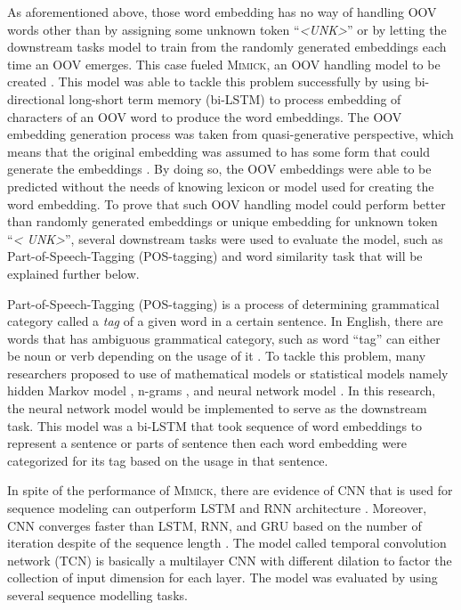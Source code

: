 As aforementioned above, those word embedding has no way of handling
OOV words other than by assigning some unknown token
``\textit{\textless UNK\textgreater}'' or by letting the downstream
tasks model to train from the randomly generated embeddings each time
an OOV emerges. This case fueled \textsc{Mimick}, an OOV handling
model to be created \citep{mimicking2017Pinter}. This model was able
to tackle this problem successfully by using bi-directional long-short
term memory (bi-LSTM) to process embedding of characters of an OOV
word to produce the word embeddings. The OOV embedding generation
process was taken from quasi-generative perspective, which means that
the original embedding was assumed to has some form that could
generate the embeddings \citep{mimicking2017Pinter}. By doing so, the
OOV embeddings were able to be predicted without the needs of knowing
lexicon or model used for creating the word embedding. To prove that
such OOV handling model could perform better than randomly generated
embeddings or unique embedding for unknown token ``\textit{\textless
UNK\textgreater}'', several downstream tasks were used to evaluate the
model, such as Part-of-Speech-Tagging (POS-tagging) and word
similarity task that will be explained further below.

Part-of-Speech-Tagging (POS-tagging) is a process of determining
grammatical category called a \textit{tag} of a given word in a certain
sentence. In English, there are words that has ambiguous grammatical
category, such as word ``tag'' can either be noun or verb depending on
the usage of it \citep{apractical1992cutting}. To tackle this problem,
many researchers proposed to use of mathematical models or statistical
models namely hidden Markov model \citep{apractical1992cutting},
n-grams \citep{tnt2000Brants}, and neural network model
\citep{finding2015ling}. In this research, the neural network model
would be implemented to serve as the downstream task. This model was a
bi-LSTM that took sequence of word embeddings to represent a sentence
or parts of sentence then each word embedding were categorized for its
tag based on the usage in that sentence.

In spite of the performance of \textsc{Mimick}, there are evidence
of CNN that is used for sequence modeling can outperform LSTM and
RNN architecture \citep{empirical2018shaujie}. Moreover, CNN converges
faster than LSTM, RNN, and GRU based on the number of iteration
despite of the sequence length \citep{empirical2018shaujie}. The model
called temporal convolution network (TCN) is basically a multilayer
CNN with different dilation to factor the collection of input
dimension for each layer. The model was evaluated by using several
sequence modelling tasks.

